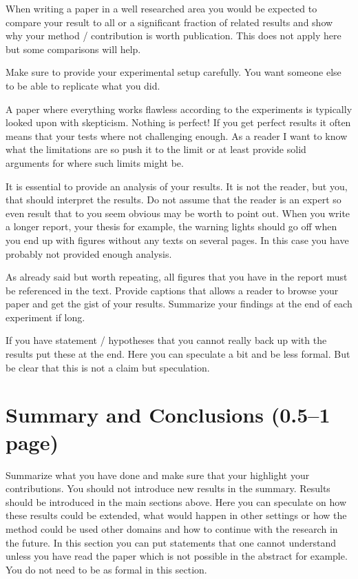 \documentclass[a4paper,12pt]{article}
\begin{document}
When writing a paper in a well researched area you would be expected
to compare your result to all or a significant fraction of related
results and show why your method / contribution is worth publication.
This does not apply here but some comparisons will help.

Make sure to provide your experimental setup carefully. You want
someone else to be able to replicate what you did.

A paper where everything works flawless according to the experiments
is typically looked upon with skepticism. Nothing is perfect! If you
get perfect results it often means that your tests where not
challenging enough. As a reader I want to know what the limitations
are so push it to the limit or at least provide solid arguments for
where such limits might be.

It is essential to provide an analysis of your results. It is not the
reader, but you, that should interpret the results. Do not assume that
the reader is an expert so even result that to you seem obvious may be
worth to point out. When you write a longer report, your thesis for
example, the warning lights should go off when you end up with figures
without any texts on several pages. In this case you have probably not
provided enough analysis.

As already said but worth repeating, all figures that you have in the
report must be referenced in the text. Provide captions that allows a
reader to browse your paper and get the gist of your
results. Summarize your findings at the end of each experiment if
long.

If you have statement / hypotheses that you cannot really back up with
the results put these at the end. Here you can speculate a bit and be
less formal.  But be clear that this is not a claim but speculation.

\section{Summary and Conclusions (0.5--1 page)}
\label{sec:summary}

Summarize what you have done and make sure that your highlight your
contributions. You should not introduce new results in the
summary. Results should be introduced in the main sections above. Here
you can speculate on how these results could be extended, what would
happen in other settings or how the method could be used other domains
and how to continue with the research in the future. In this section
you can put statements that one cannot understand unless you have read
the paper which is not possible in the abstract for example. You do
not need to be as formal in this section.





\end{document}
